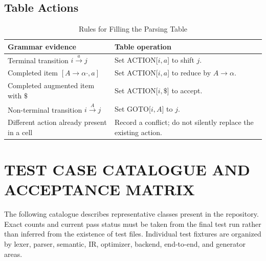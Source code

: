 \documentclass[12pt,a4paper,oneside]{report}
\begin{document}
\section{Table Actions}
\begin{longtable}{p{}p{}}
\caption{Rules for Filling the Parsing Table}\\
\toprule
\textbf{Grammar evidence} & \textbf{Table operation}\\
\midrule
Terminal transition $i\xrightarrow{a}j$ & Set ACTION[$i,a$] to shift $j$.\\
Completed item $[A\to\alpha\cdot,a]$ & Set ACTION[$i,a$] to reduce by $A\to\alpha$.\\
Completed augmented item with $\$$ & Set ACTION[$i,\$$] to accept.\\
Non-terminal transition $i\xrightarrow{A}j$ & Set GOTO[$i,A$] to $j$.\\
Different action already present in a cell & Record a conflict; do not silently replace the existing action.\\
\bottomrule
\end{longtable}

\chapter{TEST CASE CATALOGUE AND ACCEPTANCE MATRIX}
The following catalogue describes representative classes present in the repository. Exact counts and current pass status must be taken from the final test run rather than inferred from the existence of test files. Individual test fixtures are organized by lexer, parser, semantic, IR, optimizer, backend, end-to-end, and generator areas.
\end{document}
